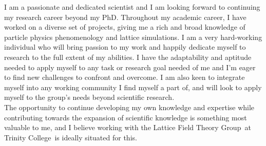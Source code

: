 \documentclass[11pt, a4paper]{awesome-cv}
\newcommand\research{Lattice Field Theory Group}
\newcommand\uni{Trinity College}
\begin{document}
\begin{cvletter}
I am a passionate and dedicated scientist and I am looking forward to continuing my research career beyond my PhD.
Throughout my academic career, I have worked on a diverse set of projects, giving me a rich and broad knowledge of particle physics phenomenology and lattice simulations.
I am a very hard-working individual who will bring passion to my work and happily dedicate myself to research to the full extent of my abilities. 
I have the adaptability and aptitude needed to apply myself to any task or research goal needed of me and I'm eager to find new challenges to confront and overcome.
I am also keen to integrate myself into any working community I find myself a part of, and will look to apply myself to the group's needs beyond scientific research. 
\\
The opportunity to continue developing my own knowledge and expertise while contributing towards the expansion of scientific knowledge is something most valuable to me, and I believe working with the \research~at \uni~is ideally situated for this. 

\end{cvletter}

\makeletterclosing
\end{document}
